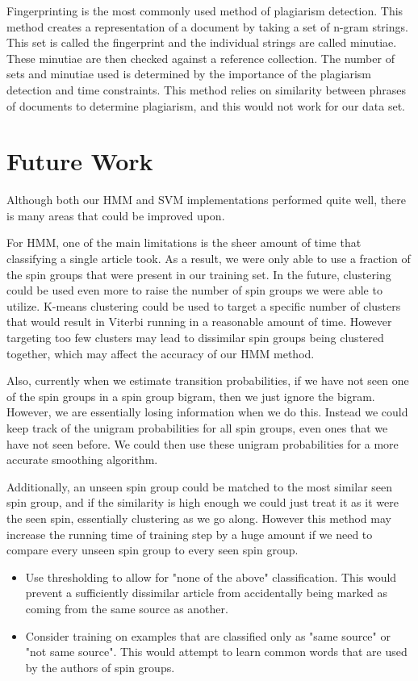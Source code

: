 \documentclass[11pt,letterpaper,oneside, titlepage]{scrartcl}
\begin{document}
Fingerprinting is the most commonly used method of plagiarism detection. This method creates a representation of a document by taking a set of n-gram strings. This set is called the fingerprint and the individual strings are called minutiae. These minutiae are then checked against a reference collection. The number of sets and minutiae used is determined by the importance of the plagiarism detection and time constraints. This method relies on similarity between phrases of documents to determine plagiarism, and this would not work for our data set. 

\section{Future Work}
Although both our HMM and SVM implementations performed quite well, there is many areas that could be improved upon.

For HMM, one of the main limitations is the sheer amount of time that classifying a single article took. As a result, we were only able to use a fraction of the spin groups that were present in our training set. In the future, clustering could be used even more to raise the number of spin groups we were able to utilize. K-means clustering could be used to target a specific number of clusters that would result in Viterbi running in a reasonable amount of time. However targeting too few clusters may lead to dissimilar spin groups being clustered together, which may affect the accuracy of our HMM method.

Also, currently when we estimate transition probabilities, if we have not seen one of the spin groups in a spin group bigram, then we just ignore the bigram. However, we are essentially losing information when we do this. Instead we could keep track of the unigram probabilities for all spin groups, even ones that we have not seen before. We could then use these unigram probabilities for a more accurate smoothing algorithm. 

Additionally, an unseen spin group could be matched to the most similar seen spin group, and if the similarity is high enough we could just treat it as it were the seen spin, essentially clustering as we go along. However this method may increase the running time of training step by a huge amount if we need to compare every unseen spin group to every seen spin group.
 
\begin{itemize}

\item Use thresholding to allow for "none of the above" classification.  This would prevent a sufficiently dissimilar article from accidentally being marked as coming from the same source as another.

\item Consider training on examples that are classified only as "same source" or "not same source".  This would attempt to learn common words that are used by the authors of spin groups.

\end{itemize}
\end{document}
